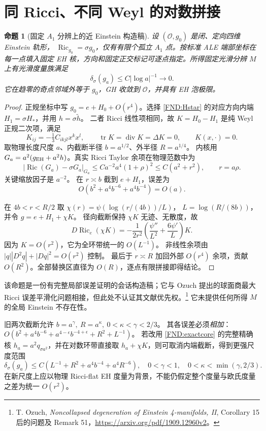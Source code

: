 \documentclass[UTF8,fontset=fandol,zihao=-4,oneside,openany]{ctexbook}
\theoremstyle{cjkplain}
\newtheorem{proposition}[theorem]{命题}
\numberwithin{equation}{chapter}
\DeclareMathOperator{\Ric}{Ric}
\DeclareMathOperator{\tr}{tr}
\begin{document}
\section{同 Ricci、不同 Weyl 的对数拼接}
\begin{proposition}[固定 \(A_1\) 分辨上的近 Einstein 构造稿]\label{FND:A1construction}
设 \((\mathcal O,g_0)\) 是闭、定向四维 Einstein 轨形，
\(\Ric_{g_0}=\sigma g_0\)，仅有有限个孤立 \(A_1\) 点。按标准 ALE 端部坐标在每一点填入固定 EH 核，方向和固定正交标记可逐点指定。所得固定光滑分辨 \(M\) 上有光滑度量族满足
\[
\delta_\sigma(g_a)\le C|\log a|^{-1}\to0 .
\]
它在趋零的奇点邻域外等于 \(g_0\)，GH 收敛到 \(\mathcal O\)，并具有 EH 泡极限。
\end{proposition}
\begin{proof}
正规坐标中写 \(g_0=e+H_0+O(r^4)\)。选择 \eqref{FND:Hstar} 的对应方向内端 \(H_1=\sigma H_*\)，并用 \(h=\sigma\widetilde h\)。
二者 Ricci 线性项相同，故
\(K=H_0-H_1\) 是纯 Weyl 正规二次项，满足
\[
K_{ij}=-\tfrac13C_{ikjl}x^kx^l,\qquad
\tr K=\operatorname{div}K=\Delta K=0,\qquad K(x,\cdot)=0.
\]
取物理长度尺度 \(a\)、内截断半径 \(b=a^{1/2}\)、外半径 \(R=a^{1/4}\)。
内核用
\(G_a=a^2(g_{\rm EH}+a^2h)\)。真实 Ricci Taylor 余项在物理范数中为
\[
|\Ric(G_a)-\sigma G_a|_{G_a}
\le Ca^{-2}a^4(1+\rho)^2
\le C(a^2+r^2),\qquad r=a\rho .
\]
关键缩放因子是 \(a^{-2}\)。
在 \(r\asymp b\) 截到 \(e+H_1\)，误差为
\[
O\!\left(b^2+a^4b^{-6}+a^4b^{-4}\right)=O(a).
\]

在 \(4b<r<R/2\) 取
\(\chi(r)=\psi(\log(r/(4b))/L)\)，
\(L=\log(R/(8b))\)，并令 \(g=e+H_1+\chi K\)。
径向截断保持 \(\chi K\) 无迹、无散度，故
\begin{equation}\label{FND:logoperator}
D\Ric_e(\chi K)
=-\frac1{2r^2}\left(\frac{\psi''}{L^2}
+\frac{6\psi'}L\right)K.
\end{equation}
因为 \(K=O(r^2)\)，它为全环带统一的 \(O(L^{-1})\)。
非线性余项由
\(|q||D^2q|+|Dq|^2=O(r^2)\) 控制。
最后于 \(r\asymp R\) 加回外部 \(O(r^4)\) 余项，贡献 \(O(R^2)\)。全部替换区直径为 \(O(R)\)，逐点有限拼接即得结论。
\end{proof}
该命题是一份有完整局部误差证明的会话构造稿；它与 Ozuch 提出的球面商最大 Ricci 误差平滑化问题相接，但此处不认证其文献优先权。\footnote{T. Ozuch, \emph{Noncollapsed degeneration of Einstein 4-manifolds, II}, Corollary 15 后的问题及 Remark 51，\url{https://arxiv.org/pdf/1909.12960v2}。}
它未提供任何所得 \(M\) 的全局 Einstein 不存在性。

旧两次截断允许
\(b=a^\gamma,\ R=a^\kappa,\ 0<\kappa<\gamma<2/3\)。
其各误差必须\emph{相加}：
\(O(b^2+a^4b^{-6}+a^{4-\epsilon}b^{-4+\epsilon}+R^2+L^{-1})\)。
若改用 \eqref{FND:exactcore} 的完整精确核
\(h_a=a^2q_{\sigma a^2}\)，并在对数环带直接取 \(h_a+\chi K\)，则可取消内端截断，得到更强尺度范围
\begin{equation}\label{FND:fullcorebound}
\delta_\sigma(g_a)\le
C\left(L^{-1}+R^2+a^4b^{-4}+a^4R^{-6}\right),
\quad
0<\gamma<1,\quad0<\kappa<\min(\gamma,2/3).
\end{equation}
在新尺度上应以物理 Ricci-flat EH 度量为背景，不能仍假定整个度量与欧氏度量之差为统一 \(O(r^2)\)。
\end{document}

